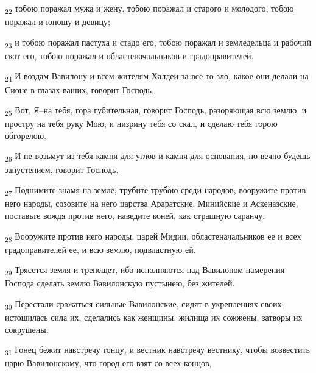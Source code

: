 \begin{tcolorbox}
\textsubscript{22} тобою поражал мужа и жену, тобою поражал и старого и молодого, тобою поражал и юношу и девицу;
\end{tcolorbox}
\begin{tcolorbox}
\textsubscript{23} и тобою поражал пастуха и стадо его, тобою поражал и земледельца и рабочий скот его, тобою поражал и областеначальников и градоправителей.
\end{tcolorbox}
\begin{tcolorbox}
\textsubscript{24} И воздам Вавилону и всем жителям Халдеи за все то зло, какое они делали на Сионе в глазах ваших, говорит Господь.
\end{tcolorbox}
\begin{tcolorbox}
\textsubscript{25} Вот, Я--на тебя, гора губительная, говорит Господь, разоряющая всю землю, и простру на тебя руку Мою, и низрину тебя со скал, и сделаю тебя горою обгорелою.
\end{tcolorbox}
\begin{tcolorbox}
\textsubscript{26} И не возьмут из тебя камня для углов и камня для основания, но вечно будешь запустением, говорит Господь.
\end{tcolorbox}
\begin{tcolorbox}
\textsubscript{27} Поднимите знамя на земле, трубите трубою среди народов, вооружите против него народы, созовите на него царства Араратские, Минийские и Аскеназские, поставьте вождя против него, наведите коней, как страшную саранчу.
\end{tcolorbox}
\begin{tcolorbox}
\textsubscript{28} Вооружите против него народы, царей Мидии, областеначальников ее и всех градоправителей ее, и всю землю, подвластную ей.
\end{tcolorbox}
\begin{tcolorbox}
\textsubscript{29} Трясется земля и трепещет, ибо исполняются над Вавилоном намерения Господа сделать землю Вавилонскую пустынею, без жителей.
\end{tcolorbox}
\begin{tcolorbox}
\textsubscript{30} Перестали сражаться сильные Вавилонские, сидят в укреплениях своих; истощилась сила их, сделались как женщины, жилища их сожжены, затворы их сокрушены.
\end{tcolorbox}
\begin{tcolorbox}
\textsubscript{31} Гонец бежит навстречу гонцу, и вестник навстречу вестнику, чтобы возвестить царю Вавилонскому, что город его взят со всех концов,
\end{tcolorbox}
